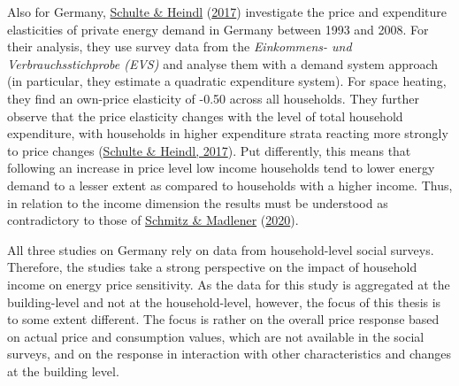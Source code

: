\documentclass[12pt,twoside]{reedthesis}
\begin{document}
Also for Germany, \protect\hyperlink{ref-schulte_heindl17}{Schulte \& Heindl} (\protect\hyperlink{ref-schulte_heindl17}{2017}) investigate the price and expenditure elasticities of private energy demand in Germany between 1993 and 2008. For their analysis, they use survey data from the \emph{Einkommens- und Verbrauchsstichprobe (EVS)} and analyse them with a demand system approach (in particular, they estimate a quadratic expenditure system). For space heating, they find an own-price elasticity of -0.50 across all households. They further observe that the price elasticity changes with the level of total household expenditure, with households in higher expenditure strata reacting more strongly to price changes (\protect\hyperlink{ref-schulte_heindl17}{Schulte \& Heindl, 2017}). Put differently, this means that following an increase in price level low income households tend to lower energy demand to a lesser extent as compared to households with a higher income. Thus, in relation to the income dimension the results must be understood as contradictory to those of \protect\hyperlink{ref-schmitz_madlener20}{Schmitz \& Madlener} (\protect\hyperlink{ref-schmitz_madlener20}{2020}).

All three studies on Germany rely on data from household-level social surveys. Therefore, the studies take a strong perspective on the impact of household income on energy price sensitivity. As the data for this study is aggregated at the building-level and not at the household-level, however, the focus of this thesis is to some extent different. The focus is rather on the overall price response based on actual price and consumption values, which are not available in the social surveys, and on the response in interaction with other characteristics and changes at the building level.
\end{document}
